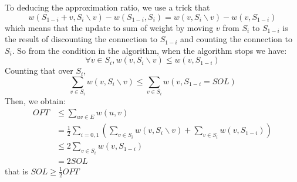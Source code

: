 \documentclass[12pt]{article}
\newenvironment{solution}[2][Solution]{\begin{trivlist}
\item[\hskip \labelsep {\bfseries #1}\hskip \labelsep {\bfseries #2.}]}{\end{trivlist}}
\begin{document}
\begin{solution}{4}
\begin{enumerate}
       To deducing the approximation ratio, we use a trick that 
       \[w(S_{1-i}+v, S_i \backslash v) - w(S_{1-i},S_i) = w(v, S_i \backslash v) - w(v,S_{1-i})\]
       which means that the update to sum of weight by moving $v$ from $S_i$ to $S_{1-i}$ is the result of discounting the connection to 
       $S_{1-i}$ and counting the connection to $S_i$. So from the condition in the algorithm, when the algorithm stops we have:
       \[\forall v \in S_i, w(v, S_i \backslash v) \le w(v,S_{1-i})\]
       Counting that over $S_i$,
       \[\sum_{v\in S_i}w(v, S_i \backslash {v}) \le \sum_{v \in S_i}w(v, S_{1-i} = SOL)\]
       Then, we obtain:
       \begin{align*}
           OPT & \le \sum_{uv \in E}w(u,v)\\
           & = \frac12\sum_{i=0,1}(\sum_{v\in S_i}w(v, S_i \backslash {v})+ \sum_{v \in S_i}w(v, S_{1-i})) \\
           & \le 2\sum_{v \in S_i}w(v, S_{1-i}) \\
           & = 2SOL
       \end{align*}
       that is $SOL \ge \frac12 OPT$
    \end{enumerate}
\end{solution}
\end{document}
